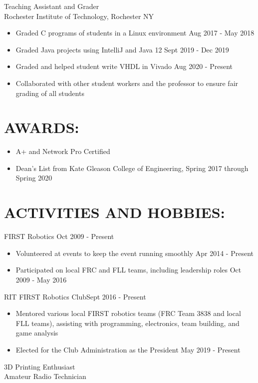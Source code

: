 \documentclass[line,margin]{res}
\begin{document}
\begin{resume}
		Teaching Assistant and Grader\\
		Rochester Institute of Technology, Rochester NY
		\begin{itemize}
			\item Graded C programs of students in a Linux environment \hfill Aug 2017 - May 2018
			\item Graded Java projects using IntelliJ and Java 12 \hfill Sept 2019 - Dec 2019
			\item Graded and helped student write VHDL in Vivado \hfill Aug 2020 - Present
			\item Collaborated with other student workers and the professor to ensure fair grading of all students
		\end{itemize}

	\section{AWARDS:}
		\begin{itemize}
			\setlength{\itemindent}{-15pt}
			\item A+ and Network Pro Certified
			\item Dean's List from Kate Gleason College of Engineering, Spring 2017 through Spring 2020
		\end{itemize}

	\section{ACTIVITIES AND HOBBIES:}

		FIRST Robotics \hfill Oct 2009 - Present
		\begin{itemize}
			\item Volunteered at events to keep the event running smoothly \hfill Apr 2014 - Present
			\item Participated on local FRC and FLL teams, including leadership roles \hfill Oct 2009 - May 2016
		\end{itemize}
		\vspace{-8pt}

		RIT FIRST Robotics Club\hfill Sept 2016 - Present
		\begin{itemize}
			\item Mentored various local FIRST robotics teams (FRC Team 3838 and local FLL teams), assisting with programming, electronics, team building, and game analysis
			\item Elected for the Club Administration as the President \hfill May 2019 - Present
		\end{itemize}

		3D Printing Enthusiast \\
		Amateur Radio Technician
\end{resume}
\end{document}
